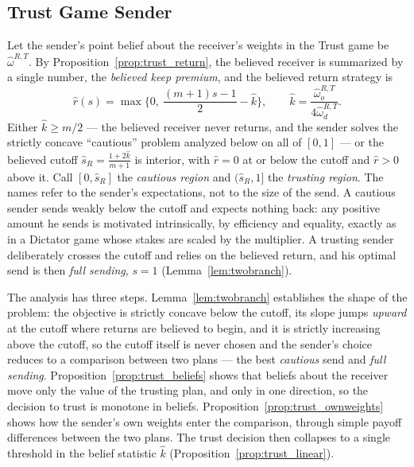 \documentclass[11pt]{article}
\theoremstyle{plain}
\theoremstyle{remark}
\begin{document}
\subsection{Trust Game Sender}

Let the sender's point belief about the receiver's weights in the Trust game be $\hat\omega^{R,T}$.  By Proposition~\ref{prop:trust_return}, the believed receiver is summarized by a single number, the \emph{believed keep premium}, and the believed return strategy is
\[
        \hat r(s)=\max\Big\{0,\ \frac{(m+1)s-1}{2}-\hat k\Big\},
        \qquad
        \hat k=\frac{\hat\omega_o^{R,T}}{4\hat\omega_d^{R,T}}.
\]
Either $\hat k\ge m/2$ --- the believed receiver never returns, and the sender solves the strictly concave ``cautious'' problem analyzed below on all of $[0,1]$ --- or the believed cutoff $\hat s_R=\frac{1+2\hat k}{m+1}$ is interior, with $\hat r=0$ at or below the cutoff and $\hat r>0$ above it.  Call $[0,\hat s_R]$ the \emph{cautious region} and $(\hat s_R,1]$ the \emph{trusting region}.  The names refer to the sender's expectations, not to the size of the send.  A cautious sender sends weakly below the cutoff and expects nothing back: any positive amount he sends is motivated intrinsically, by efficiency and equality, exactly as in a Dictator game whose stakes are scaled by the multiplier.  A trusting sender deliberately crosses the cutoff and relies on the believed return, and his optimal send is then \emph{full sending}, $s=1$ (Lemma~\ref{lem:twobranch}).

The analysis has three steps.  Lemma~\ref{lem:twobranch} establishes the shape of the problem: the objective is strictly concave below the cutoff, its slope jumps \emph{upward} at the cutoff where returns are believed to begin, and it is strictly increasing above the cutoff, so the cutoff itself is never chosen and the sender's choice reduces to a comparison between two plans --- the best \emph{cautious} send and \emph{full sending}.  Proposition~\ref{prop:trust_beliefs} shows that beliefs about the receiver move only the value of the trusting plan, and only in one direction, so the decision to trust is monotone in beliefs.  Proposition~\ref{prop:trust_ownweights} shows how the sender's own weights enter the comparison, through simple payoff differences between the two plans.  The trust decision then collapses to a single threshold in the belief statistic $\hat k$ (Proposition~\ref{prop:trust_linear}).
\end{document}

